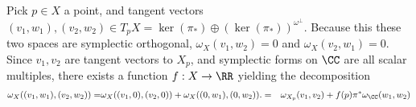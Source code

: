 

    Pick $p\in X$ a point, and tangent vectors  $(v_1, w_1), (v_2, w_2)\in T_pX=\ker(\pi_*)\oplus(\ker(\pi_*))^{\omega^\bot}.$ 
    Because this these two spaces are symplectic orthogonal, $\omega_X(v_1, w_2)=0$ and $\omega_X(v_2, w_1)=0$. 
    Since $v_1, v_2$ are tangent vectors to $X_p$, and symplectic forms on $\CC$ are all scalar multiples, there exists a function $f: X\to \RR$ yielding the decomposition
    \begin{align*} 
    \omega_X((v_1, w_1), (v_2, w_2))=&\omega_X((v_1, 0), (v_2, 0))+ \omega_X((0, w_1), (0, w_2)).
    =&\omega_{X_p}(v_1, v_2)+f(p) \pi^*\omega_\CC(w_1, w_2)
    \end{align*}


